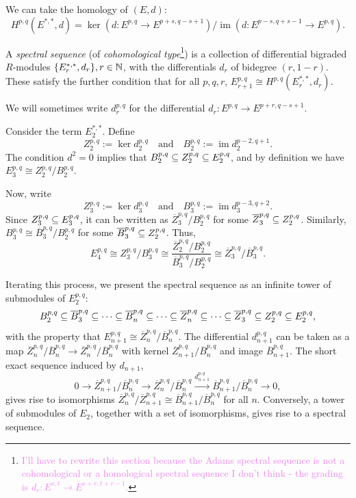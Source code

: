 \documentclass{MetricNotes2023}
\def\subq{\ensuremath\subseteq}
\def\nat{\ensuremath\mathbb{N}}
\DeclareMathOperator{\im}{im}
\def\textcolour{\textcolor}
\begin{document}
We can take the homology of \((E, d)\):
\[H^{p, q}(E^{*, *}, d)=\ker(d : E^{p, q}\to E^{p+s, q-s+1})/\im(d : E^{p-s, q+s-1}\to E^{p, q}).\]

\begin{definition}
A \textit{spectral sequence} (of \textit{cohomological type}\footnote{\textcolour{violet}{I'll have to rewrite this section because the Adams spectral sequence is not a cohomological or a homological spectral sequence I don't think - the grading is \(d_r : E^{s,t}\to E^{s+r,t+r-1}\).}}) is a collection of differential bigraded \(R\)-modules \(\{E^{*, *}_r, d_r\}, r \in \nat\), with the differentials \(d_r\) of bidegree \((r, 1-r)\). These satisfy the further condition that for all \(p, q, r\), \(E^{p, q}_{r+1}\cong H^{p, q}(E_r^{*, *}, d_r)\).
\end{definition}

We will sometimes write \(d^{p, q}_r\) for the differential \(d_r : E^{p, q}\to E^{p+r,q-s+1}\). 

Consider the term \(E_2^{*, *}\). Define 
\[Z_2^{p, q}:=\ker d_2^{p,q} \quad \text{and} \quad B_2^{p,q}:=\im d_2^{p-2,q+1}.\]
The condition \(d^2=0\) implies that \(B_2^{p,q}\subq Z_2^{p,q}\subq E_2^{p,q}\), and by definition we have \(E_3^{p,q}\cong Z^{p,q}_2/B_2^{p,q}\). 

Now, write 
\[Z_3^{p, q}:=\ker d_3^{p,q} \quad \text{and} \quad B_3^{p,q}:=\im d_3^{p-3,q+2}.\]
Since \(Z_3^{p,q}\subq E^{p,q}_3\), it can be written as \(\overline{Z}_3^{p,q}/B_2^{p,q}\) for some \(\overline{Z}_3^{p,q}\subq Z_2^{p,q}\). Similarly, \(B_3^{p,q}\cong \overline B_3^{p,q}/B_2^{p,q}\) for some \(\overline B_3^{p,q}\subq Z_2^{p,q}\). Thus,
\[E_4^{p,q}\cong Z_3^{p,q}/B_3^{p,q}\cong \frac{\overline Z_2^{p,q}/B_2^{p,q}}{\overline B_3^{p,q}/B_2^{p,q}}\cong \overline Z_3^{p,q}/\overline B_3^{p,q}.\]

Iterating this process, we present the spectral sequence as an infinite tower of submodules of \(E_2^{p,q}\):
\[B_2^{p,q}\subq \overline B_3^{p,q}\subq \cdots \subq \overline B_n^{p,q}\subq \cdots \subq \overline Z_n^{p,q}\subq \cdots \subq \overline Z_3^{p,q}\subq Z_2^{p,q}\subq E_2^{p,q},\]
with the property that \(E^{p,q}_{n+1}\cong \overline Z_n^{p,q}/\overline B_n^{p,q}\). The differential \(d_{n+1}^{p,q}\) can be taken as a map \(\overline Z^{p,q}_n/\overline B_n^{p,q}\to\overline Z_n^{p,q}/\overline B_n^{p,q}\) with kernel \(\overline Z_{n+1}^{p,q}/\overline B_n^{p,q}\) and image \(\overline B_{n+1}^{p,q}\). The short exact sequence induced by \(d_{n+1}\),
\[0 \to \overline Z^{p,q}_{n+1}/\overline B_n^{p,q}\to \overline Z_n^{p,q}/\overline B_n^{p,q} \xrightarrow{d_{n+1}^{p,q}} \overline B_{n+1}^{p,q}/\overline{B}_n^{p,q}\to 0,\]
gives rise to isomorphisms \(\overline{Z}_n^{p,q}/\overline{Z}_{n+1}^{p,q}\cong \overline{B}_{n+1}^{p,q}/\overline{B}_n ^{p,q}\) for all \(n\). Conversely, a tower of submodules of \(E_2\), together with a set of isomorphisms, gives rise to a spectral sequence. 
\end{document}
